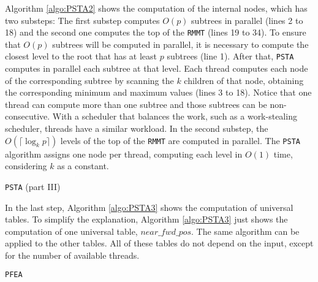 Algorithm \ref{algo:PSTA2} shows the computation of the internal
nodes, which has two substeps: The first substep computes $O(p)$
subtrees in parallel (lines 2 to 18) and the second one computes the
top of the {\tt RMMT} (lines 19 to 34). To ensure that $O(p)$ subtrees
will be computed in parallel, it is necessary to compute the closest
level to the root that has at least $p$ subtrees (line 1). After that,
{\tt PSTA} computes in parallel each subtree at that level. Each
thread computes each node of the corresponding subtree by scanning the
$k$ children of that node, obtaining the corresponding minimum and
maximum values (lines 3 to 18). Notice that one thread can compute
more than one subtree and those subtrees can be non-consecutive. With
a scheduler that balances the work, such as a work-stealing scheduler,
threads have a similar workload. In the second substep, the $O(\lceil
\log_{k}p \rceil)$ levels of the top of the {\tt RMMT} are computed in
parallel. The {\tt PSTA} algorithm assigns one node per thread,
computing each level in $O(1)$ time, considering $k$ as a constant.


\begin{algorithm}[t]
\small
\SetVlineSkip{-2cm}
  \LinesNumbered
  \SetAlgoNoEnd
  \DontPrintSemicolon
  \BlankLine%


  \caption{{\tt PSTA} (part III)}
  \label{algo:PSTA3}
\end{algorithm}
\normalsize

In the last step, Algorithm \ref{algo:PSTA3} shows the computation of
universal tables. To simplify the explanation, Algorithm
\ref{algo:PSTA3} just shows the computation of one universal table,
$near\_fwd\_pos$. The same algorithm can be applied to the other
tables. All of these tables do not depend on the input, except for the
number of available threads.


\begin{algorithm}[t]
\small
\SetVlineSkip{-2cm}
  \LinesNumbered
  \SetAlgoNoEnd
  \DontPrintSemicolon
  \BlankLine%

  \caption{{\tt PFEA}}
  \label{algo:PFEA}
\end{algorithm}
\normalsize
